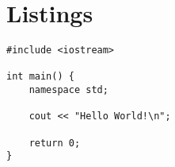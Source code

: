 \documentclass{swddoc}
\begin{document}
\section{Listings}

\lstset{style=c_code_style}
\begin{lstlisting}
#include <iostream>

int main() {
	namespace std;

	cout << "Hello World!\n";
	
	return 0;
}
\end{lstlisting}
\end{document}
